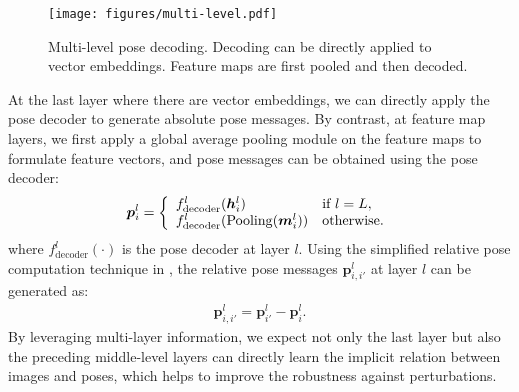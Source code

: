 \documentclass[letterpaper]{article} \usepackage{aaai23}  \usepackage{times}  \usepackage{helvet}  \usepackage{courier}  \usepackage[hyphens]{url}  \usepackage{graphicx} \urlstyle{rm} \def\UrlFont{\rm}  \usepackage{natbib}  \usepackage{caption} \frenchspacing  \setlength{\pdfpagewidth}{8.5in} \setlength{\pdfpageheight}{11in} \usepackage{booktabs}
\theoremstyle{remark}
\theoremstyle{plain}
\newcommand{\mbh}{\bm{h}}
\newcommand{\mbm}{\bm{m}}
\newcommand{\mbp}{\bm{p}}
\begin{document}
\begin{figure}[!t]
\begin{center}
\texttt{[image: figures/multi-level.pdf]}
\end{center}
\caption{Multi-level pose decoding. Decoding can be directly applied to vector embeddings. Feature maps are first pooled and then decoded.  }
\label{fig:multi-level}
\end{figure}

At the last layer where there are vector embeddings, we can directly apply the pose decoder to generate absolute pose messages. By contrast, at feature map layers,  we first apply a global average pooling module on the feature maps to formulate feature vectors, and pose messages can be obtained using the  pose decoder:
\begin{align}
\mbp^{l}_{i}=
\left\{
\begin{array}{l l}
f_{\mathrm{decoder}}^{l}( \mbh^{l}_{i}) & \text{if}\  l=L, \\
f_{\mathrm{decoder}}^{l}( \mathrm{Pooling}(\mbm^{l}_{i})) & \text{otherwise}. \\
\end{array}
\right.
\end{align}
where $f_{\mathrm{decoder}}^{l}(\cdot)$ is the pose decoder at layer $l$. Using the simplified relative pose computation technique in \cite{atloc}, the relative pose messages $\mbp^{l}_{i,i'}$ at layer $l$ can be generated as:
\begin{align}
\mbp^{l}_{i,i'} = \mbp^{l}_{i'} - \mbp^{l}_{i}.
\end{align}
By leveraging multi-layer information, we expect not only the last layer but also the preceding middle-level layers can directly learn the implicit relation between images and poses, which helps to improve the robustness against perturbations.
\end{document}
